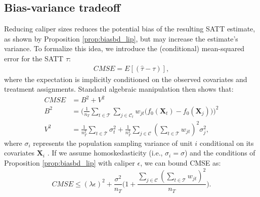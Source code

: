 \documentclass{article}
\newcommand{\bX}{\mathbf{X}}
\newcommand{\Xt}{\mathbf{X}_t}
\newcommand{\Xj}{\mathbf{X}_j}
\newcommand{\Ct}{\mathcal{C}_{t}}
\begin{document}
\subsection{Bias-variance tradeoff}
\label{sec:bv}

Reducing caliper sizes reduces the potential bias of the resulting SATT estimate, as shown by Proposition \ref{prop:biasbd_lip}, but may increase the estimate's variance.
To formalize this idea, we introduce the (conditional) mean-squared error for the SATT $\tau$:
\begin{align*}
    CMSE = E[(\hat{\tau} - \tau)],
\end{align*}
where the expectation is implicitly conditioned on the observed covariates and treatment assignments.
Standard algebraic manipulation then shows that:
\begin{align*}
    CMSE &= B^2 + V^2 \\
    B^2 &= 
        \Big(\frac{1}{n_T} \sum_{t \in \mathcal{T}} \sum_{j \in \Ct} 
            w_{jt} \big( f_0(\Xt) - f_0(\Xj) \big) \Big)^2 \\
    V^2 &=
        \frac{1}{n_T^2} \sum_{t \in \mathcal{T}} \sigma_t^2 +
        \frac{1}{n_T^2} \sum_{j \in \mathcal{C}} (\sum_{t \in \mathcal{T}} w_{jt})^2 \sigma_j^2,
\end{align*}
where $\sigma_i$ represents the population sampling variance of unit $i$ conditional on its covariates $\bX_i$ \citep{kallus2020generalized}.
If we assume homoskedasticity (i.e., $\sigma_i = \sigma$) and the conditions of Proposition \ref{prop:biasbd_lip} with caliper $\epsilon$, we can bound CMSE as:
\begin{equation}
\label{eq:cmsebd}
    CMSE \leq 
        (\lambda \epsilon)^2 +
        \frac{\sigma^2}{n_T} \Big(1 + \frac{\sum_{j \in \mathcal{C}} (\sum_{t \in \mathcal{T}} w_{jt})^2}{n_T} \Big).
\end{equation}
\end{document}
